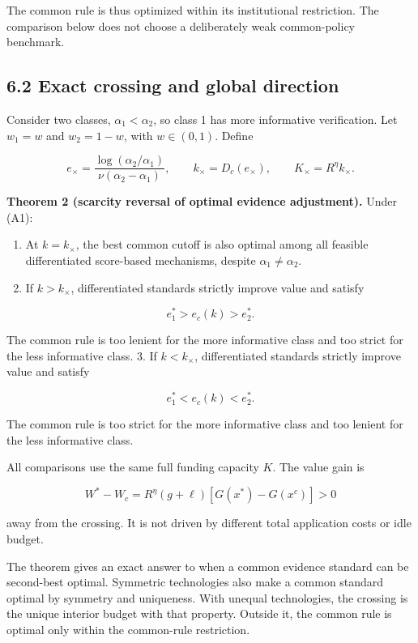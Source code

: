 \documentclass[
  11pt,
]{article}
\providecommand{\tightlist}{%
  \setlength{\itemsep}{0pt}\setlength{\parskip}{0pt}}
\begin{document}
The common rule is thus optimized within its institutional restriction.
The comparison below does not choose a deliberately weak common-policy
benchmark.

\subsection{6.2 Exact crossing and global
direction}\label{exact-crossing-and-global-direction}

Consider two classes, \(\alpha_1<\alpha_2\), so class 1 has more
informative verification. Let \(w_1=w\) and \(w_2=1-w\), with
\(w\in(0,1)\). Define

\[e_\times=\frac{\log(\alpha_2/\alpha_1)}{\nu(\alpha_2-\alpha_1)},
\qquad k_\times=D_c(e_\times),\qquad K_\times=R^{\eta}k_\times. \tag{17}\]

\textbf{Theorem 2 (scarcity reversal of optimal evidence adjustment).}
Under (A1):

\begin{enumerate}
\def\labelenumi{\arabic{enumi}.}
\tightlist
\item
  At \(k=k_\times\), the best common cutoff is also optimal among all
  feasible differentiated score-based mechanisms, despite
  \(\alpha_1\ne\alpha_2\).
\item
  If \(k>k_\times\), differentiated standards strictly improve value and
  satisfy
\end{enumerate}

\[e_1^*>e_c(k)>e_2^*.\]

The common rule is too lenient for the more informative class and too
strict for the less informative class. 3. If \(k<k_\times\),
differentiated standards strictly improve value and satisfy

\[e_1^*<e_c(k)<e_2^*.\]

The common rule is too strict for the more informative class and too
lenient for the less informative class.

All comparisons use the same full funding capacity \(K\). The value gain
is

\[W^*-W_c=R^{\eta}(g+\ell)[G(x^*)-G(x^c)]>0 \tag{18}\]

away from the crossing. It is not driven by different total application
costs or idle budget.

The theorem gives an exact answer to when a common evidence standard can
be second-best optimal. Symmetric technologies also make a common
standard optimal by symmetry and uniqueness. With unequal technologies,
the crossing is the unique interior budget with that property. Outside
it, the common rule is optimal only within the common-rule restriction.
\end{document}
